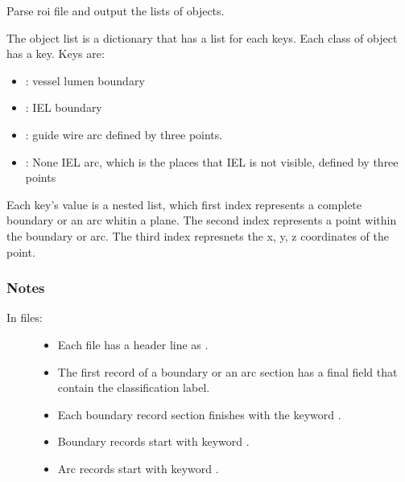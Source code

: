 \documentclass[letterpaper,10pt,english]{sphinxmanual}
\begin{document}
\begin{fulllineitems}
\label{\detokenize{index:util.read_oct_roi_file.roi_file_parser}}
Parse roi file and output the lists of objects.

The object list is a dictionary that has a list for each keys.  Each class of object has a key.  Keys are:
\begin{itemize}
\item {} 
: vessel lumen boundary

\item {} 
: IEL boundary

\item {} 
: guide wire arc defined by three points.

\item {} 
: None IEL arc, which is the places that IEL is not visible, defined by three points

\end{itemize}

Each key’s value is a nested list, which first index represents a complete boundary or an arc whitin a plane.
The second index represents a point within the boundary or arc.  The third index represnets the x, y, z
coordinates of the point.
\subsubsection*{Notes}
\begin{description}
\item[{In  files:}] \leavevmode\begin{itemize}
\item {} 
Each file has a header line as .

\item {} 
The first record of a boundary or an arc section has a final field that contain the classification label.

\item {} 
Each boundary record section finishes with the keyword .

\item {} 
Boundary records start with keyword .

\item {} 
Arc records start with keyword .


\end{itemize}
\end{description}
\end{fulllineitems}
\end{document}
